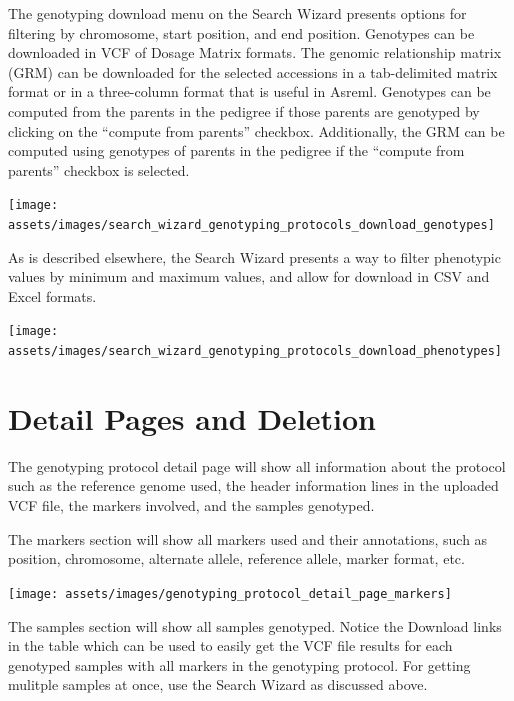 \documentclass[
  12pt,
]{book}
\begin{document}
The genotyping download menu on the Search Wizard presents options for filtering by chromosome, start position, and end position. Genotypes can be downloaded in VCF of Dosage Matrix formats. The genomic relationship matrix (GRM) can be downloaded for the selected accessions in a tab-delimited matrix format or in a three-column format that is useful in Asreml. Genotypes can be computed from the parents in the pedigree if those parents are genotyped by clicking on the ``compute from parents'' checkbox. Additionally, the GRM can be computed using genotypes of parents in the pedigree if the ``compute from parents'' checkbox is selected.

\begin{center}\texttt{[image: assets/images/search\_wizard\_genotyping\_protocols\_download\_genotypes]} \end{center}

As is described elsewhere, the Search Wizard presents a way to filter phenotypic values by minimum and maximum values, and allow for download in CSV and Excel formats.

\begin{center}\texttt{[image: assets/images/search\_wizard\_genotyping\_protocols\_download\_phenotypes]} \end{center}

\hypertarget{detail-pages-and-deletion}{%
\section{Detail Pages and Deletion}\label{detail-pages-and-deletion}}

The genotyping protocol detail page will show all information about the protocol such as the reference genome used, the header information lines in the uploaded VCF file, the markers involved, and the samples genotyped.

The markers section will show all markers used and their annotations, such as position, chromosome, alternate allele, reference allele, marker format, etc.

\begin{center}\texttt{[image: assets/images/genotyping\_protocol\_detail\_page\_markers]} \end{center}

The samples section will show all samples genotyped. Notice the Download links in the table which can be used to easily get the VCF file results for each genotyped samples with all markers in the genotyping protocol. For getting mulitple samples at once, use the Search Wizard as discussed above.
\end{document}
